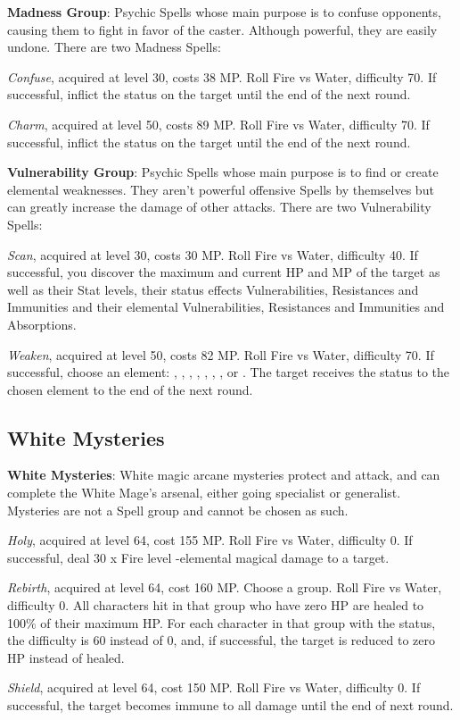 \begin{multicols}{2}
    \textbf{Madness Group}: Psychic Spells whose main purpose is to confuse opponents, causing them to fight in favor of the caster. Although powerful, they are easily undone. There are two Madness Spells:

    \textit{Confuse}, acquired at level 30, costs 38 MP. Roll Fire vs Water, difficulty 70. If successful, inflict the  status on the target until the end of the next round.

    \textit{Charm}, acquired at level 50, costs 89 MP. Roll Fire vs Water, difficulty 70. If successful, inflict the  status on the target until the end of the next round.

    \textbf{Vulnerability Group}: Psychic Spells whose main purpose is to find or create elemental weaknesses. They aren’t powerful offensive Spells by themselves but can greatly increase the damage of other attacks. There are two Vulnerability Spells:

    \textit{Scan}, acquired at level 30, costs 30 MP. Roll Fire vs Water, difficulty 40. If successful, you discover the maximum and current HP and MP of the target as well as their Stat levels, their status effects Vulnerabilities, Resistances and Immunities and their elemental Vulnerabilities, Resistances and Immunities and Absorptions.

    \textit{Weaken}, acquired at level 50, costs 82 MP. Roll Fire vs Water, difficulty 70. If successful, choose an element: , , , , , , ,  or . The target receives the status  to the chosen element to the end of the next round. 

    \subsection{White Mysteries}

    \textbf{White Mysteries}: White magic arcane mysteries protect and attack, and can complete the White Mage's arsenal, either going specialist or generalist. Mysteries are not a Spell group and cannot be chosen as such.

    \textit{Holy}, acquired at level 64, cost 155 MP. Roll Fire vs Water, difficulty 0. If successful, deal 30 x Fire level -elemental magical damage to a target.  

    \textit{Rebirth}, acquired at level 64, cost 160 MP. Choose a group. Roll Fire vs Water, difficulty 0. All characters hit in that group who have zero HP are healed to 100\% of their maximum HP. For each character in that group with the  status, the difficulty is 60 instead of 0, and, if successful, the target is reduced to zero HP instead of healed.

    \textit{Shield}, acquired at level 64, cost 150 MP. Roll Fire vs Water, difficulty 0. If successful, the target becomes immune to all damage until the end of next round.


\end{multicols}

